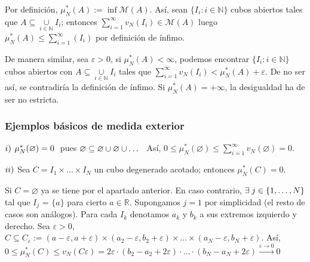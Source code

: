 \documentclass[12pt,a4paper]{article}
\newcommand{\R}{\mathbb{R}}
\newcommand{\N}{\mathbb{N}}
\newcommand{\smallcup}{\mathop{\cup}\limits}
\newcommand{\smallsum}{\mathop{\sum}\limits}
\newcounter{unit}[section]
\newcounter{chapter}[unit]
\renewcommand{\theunit}{\arabic{unit}}
\renewcommand{\thechapter}{\arabic{chapter}}
\renewcommand{\thesubsubsection}{\theunit.\thechapter.\arabic{subsubsection}}
\newcommand{\result}[1]{%
  \subsubsection{#1}%
  \label{result:\thesubsubsection}
}
\begin{document}
Por definición, $\mu^*_N(A) := \inf \mathcal{M}(A)$. Así, sean $\{I_i : i \in\N\}$ cubos abiertos tales que $A \subseteq \smallcup_{i\in\N}I_i$;
entonces $\smallsum_{i=1}^\infty v_N(I_i) \in \mathcal{M}(A)$ luego $\mu^*_N(A) \leq \smallsum_{i=1}^\infty(I_i)$ por definición de ínfimo.

\vspace{2mm} De manera similar, sea $\varepsilon > 0$, si $\mu^*_N(A) < \infty$, podemos encontrar $\{I_i : i\in\N\}$ cubos abiertos con $A \subseteq \smallcup_{i\in\N}I_i$
tales que $\smallsum_{i=1}^\infty v_N(I_i) < \mu^*_N(A) + \varepsilon$.
De no ser así, se contradiría la definición de ínfimo. Si $\mu^*_N(A) = +\infty$, la desigualdad ha de ser no estricta.

\vspace{6mm}
\result{Ejemplos básicos de medida exterior}
$\romannumeral 1)$ $\mu^*_N(\varnothing) = 0 \hspace{1mm}$  pues $\varnothing \subseteq \varnothing \cup \varnothing \cup \ldots \hspace{2mm}$
Así, $0 \leq \mu^*_N(\varnothing) \leq \smallsum_{i=1}^{\infty}v_N(\varnothing) = 0$.

\vspace{4mm} \noindent
$\romannumeral 2)$ Sea $C = I_1 \times \ldots \times I_N$ un cubo degenerado acotado; entonces $\mu^*_N(C) = 0$.
\begin{adjustwidth}{0.07\textwidth}{}
    Si $C = \varnothing$ ya se tiene por el apartado anterior.
    \newline En caso contrario, $\exists \hspace{1mm} j \in \{1,\ldots,N\}$ tal que $I_j$ = $\{a\}$ para cierto $a \in \R$.
    \newline Supongamos $j=1$ por simplicidad (el resto de casos son análogos).
    \newline Para cada $I_k$ denotamos $a_k$ y $b_k$ a sus extremos izquierdo y derecho.
    \newline Sea $\varepsilon > 0$, $C \subseteq C_\varepsilon := (a - \varepsilon, a + \varepsilon) \times (a_2 - \varepsilon, b_2 + \varepsilon) \times \ldots \times (a_N - \varepsilon, b_N + \varepsilon)$.
    \newline Así, $0 \leq \mu^*_N(C) \leq v_N(C\varepsilon) = 2\varepsilon \cdot (b_2 -a_2 +2\varepsilon)  \cdot \ldots \cdot (b_N - a_N + 2\varepsilon) \xrightarrow{\varepsilon \to 0}0$
\end{adjustwidth}
\end{document}
